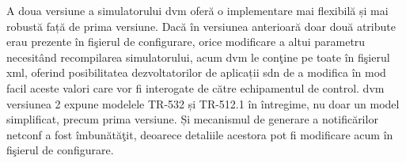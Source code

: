 A doua versiune a simulatorului \gls{dvm} oferă o implementare mai flexibilă și mai robustă față de prima versiune. Dacă în versiunea anterioară doar două atribute erau prezente în fişierul de configurare, orice modificare a altui parametru necesitând recompilarea simulatorului, acum \gls{dvm} le conţine pe toate în fişierul \gls{xml}, oferind posibilitatea dezvoltatorilor de aplicații \gls{sdn} de a modifica în mod facil aceste valori care vor fi interogate de către echipamentul de control. \gls{dvm} versiunea 2 expune modelele TR-532 și TR-512.1 în întregime, nu doar un model simplificat, precum prima versiune. Și mecanismul de generare a notificărilor \gls{netconf} a fost îmbunătăţit, deoarece detaliile acestora pot fi modificare acum în fişierul de configurare.